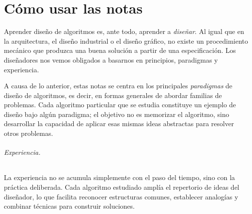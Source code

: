\part*{Cómo usar las notas}

Aprender diseño de algoritmos es, ante todo, aprender a \emph{diseñar}. Al igual que en la arquitectura, el diseño industrial o el diseño gráfico, no existe un procedimiento mecánico que produzca una buena solución a partir de una especificación. Los diseñadores nos vemos obligados a basarnos en principios, paradigmas y experiencia. 

A causa de lo anterior, estas notas se centra en los principales \emph{paradigmas} de diseño de algoritmos, es decir, en formas generales de abordar familias de problemas. Cada algoritmo particular que se estudia constituye un ejemplo de diseño bajo algún paradigma; el objetivo no es memorizar el algoritmo, sino desarrollar la capacidad de aplicar esas mismas ideas abstractas para resolver otros problemas.

\paragraph{Experiencia.} La experiencia no se acumula simplemente con el paso del tiempo, sino con la práctica deliberada. Cada algoritmo estudiado amplía el repertorio de ideas del diseñador, lo que facilita reconocer estructuras comunes, establecer analogías y combinar técnicas para construir soluciones.
